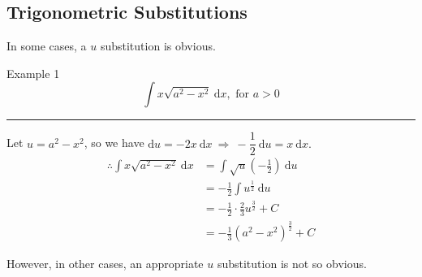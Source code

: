 \documentclass[12pt,a4paper]{article}
\def\d{{\mathrm{d}}}
\begin{document}
\subsection{Trigonometric Substitutions}
In some cases, a $u$ substitution is obvious. 
\begin{eg}{Example 1}
	$$\int x\sqrt{a^2-x^2}\ \d x, \text{ for }a>0$$
	\noindent\rule[0.25\baselineskip]{\textwidth}{1pt}
	Let $u=a^2-x^2$, so we have $\d u=-2x\ \d x\ \Rightarrow\ -\dfrac{1}{2}\ \d u=x\ \d x.$
	$$\begin{aligned}
		\therefore\int x\sqrt{a^2-x^2}\ \d x&=\int\sqrt{u}\left(-\frac{1}{2}\right)\ \d u\\
		&=-\frac{1}{2}\int u^{\frac{1}{2}}\ \d u\\
		&=-\frac{1}{2}\cdot\frac{2}{3}u^{\frac{3}{2}}+C\\
		&=-\frac{1}{3}\left(a^2-x^2\right)^{\frac{3}{2}}+C
	\end{aligned}$$
\end{eg}
However, in other cases, an appropriate $u$ substitution is not so obvious. 
\end{document}
